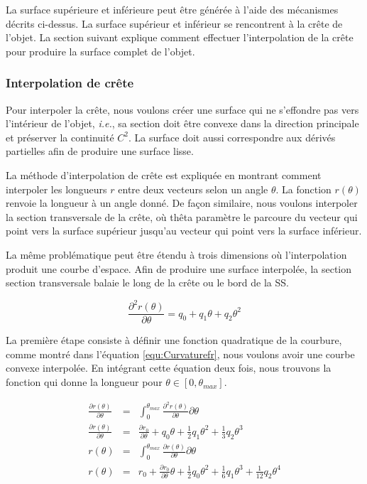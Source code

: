 La surface supérieure et inférieure peut être générée à l'aide des mécanismes décrits ci-dessus.
La surface supérieur et inférieur se rencontrent à la crête de l'objet.
La section suivant explique comment effectuer l'interpolation de la crête pour produire la surface complet de l'objet.

\subsubsection{Interpolation de crête}
\label{sec:crestInterpolationfr}

Pour interpoler la crête, nous voulons créer une surface qui
ne s'effondre pas vers l'intérieur de l'objet, \textit{i.e.},
sa section doit être convexe dans la direction principale et préserver la continuité $C^2$. 
La surface doit aussi correspondre aux dérivés partielles afin de produire une surface lisse.

La méthode d'interpolation de crête est expliquée en montrant comment interpoler les longueurs $r$ 
entre deux vecteurs selon un angle $\theta$.
La fonction $r(\theta)$ renvoie la longueur à un angle donné.
De façon similaire, nous voulons interpoler la section transversale de la crête, où thêta
paramètre le parcoure du vecteur qui point vers la surface supérieur jusqu'au vecteur qui point 
vers la surface inférieur.

La même problématique peut être étendu à trois dimensions où l'interpolation produit une courbe d'espace.
Afin de produire une surface interpolée, la section section transversale
balaie le long de la crête ou le bord de la SS.

\begin{equation} 
 \frac{\partial^2 r(\theta)}{\partial \theta} = q_0  +  q_1  \theta + q_2  \theta^2  
 \label{equ:curvaturefr}
\end{equation}

La première étape consiste à définir une fonction quadratique de la courbure, comme montré dans l'équation
\ref{equ:Curvaturefr}, nous voulons avoir une courbe convexe interpolée.
En intégrant cette équation deux fois, nous trouvons la fonction qui donne la longueur pour $\theta \in [0, \theta_{max}]$.

\begin{eqnarray} 
  \frac{\partial r(\theta)}{\partial \theta} &=& \int_0^{\theta_{max}} \frac{\partial^2 r(\theta)}{\partial \theta} \partial \theta \\
  \frac{\partial r(\theta)}{\partial \theta} &=& \frac{\partial r_0}{\partial \theta} + q_0  \theta + \frac{1}{2}  q_1  \theta^2 + \frac{1}{3}  q_2  \theta^3  \\
  r(\theta) &=& \int_0^{\theta_{max}} \frac{\partial r(\theta)}{\partial \theta} \partial \theta \\
  r(\theta) &=& r_0 + \frac{\partial r_0}{\partial \theta}  \theta + \frac{1}{2}  q_0  \theta^2 + \frac{1}{6}  q_1  \theta^3 + \frac{1}{12}  q_2  \theta^4  
\end{eqnarray}

